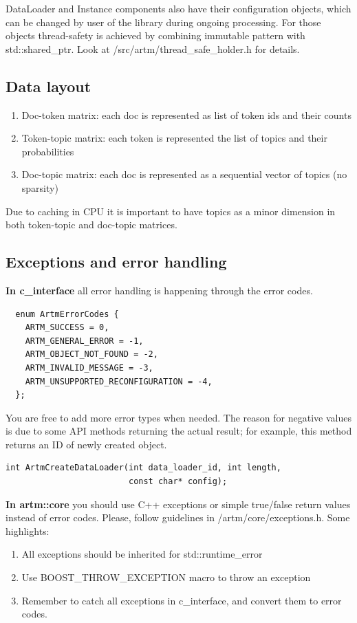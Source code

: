 \documentclass[11pt,a4paper,twoside]{report}
\begin{document}
DataLoader and Instance components also have their configuration objects,
which can be changed by user of the library during ongoing processing.
For those objects thread-safety is achieved by combining immutable pattern with std::shared\_ptr.
Look at /src/artm/thread\_safe\_holder.h for details.

\subsection{Data layout}
\begin{enumerate}
    \item Doc-token matrix: each doc is represented as list of token ids and their counts
    \item Token-topic matrix: each token is represented the list of topics and their probabilities
    \item Doc-topic matrix: each doc is represented as a sequential vector of topics (no sparsity)
\end{enumerate}

Due to caching in CPU it is important to have topics as a minor dimension in both token-topic and doc-topic matrices.

\subsection{Exceptions and error handling}

\textbf{In c\_interface} all error handling is happening through the error codes.
\begin{verbatim}
  enum ArtmErrorCodes {
    ARTM_SUCCESS = 0,
    ARTM_GENERAL_ERROR = -1,
    ARTM_OBJECT_NOT_FOUND = -2,
    ARTM_INVALID_MESSAGE = -3,
    ARTM_UNSUPPORTED_RECONFIGURATION = -4,
  };
\end{verbatim}  
You are free to add more error types when needed.
The reason for negative values is due to some API methods
returning the actual result; for example, this method returns an ID of newly created object.
\begin{verbatim}
int ArtmCreateDataLoader(int data_loader_id, int length, 
                         const char* config);
\end{verbatim}

\textbf{In artm::core} you should use C++ exceptions 
or simple true/false return values instead of error codes.
Please, follow guidelines in /artm/core/exceptions.h.
Some highlights:
\begin{enumerate}
    \item All exceptions should be inherited for std::runtime\_error
    \item Use BOOST\_THROW\_EXCEPTION macro to throw an exception
    \item Remember to catch all exceptions in c\_interface, and convert them to error codes.
\end{enumerate}
\end{document}
